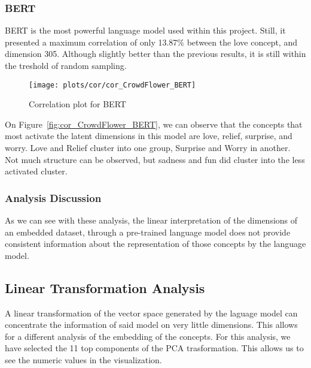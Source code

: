 \subsubsection{BERT}
BERT is the most powerful language model used within this project. Still, it presented a maximum correlation of only 13.87\% between the love concept, and dimension 305. Although slightly better than the previous results, it is still within the treshold of random sampling.
\begin{figure}[H]
  \texttt{[image: plots/cor/cor\_CrowdFlower\_BERT]}
  \centering
  \caption{Correlation plot for BERT}
\end{figure}\label{fig:cor_CrowdFlower_BERT}
On Figure~\ref{fig:cor_CrowdFlower_BERT}, we can observe that the concepts that most activate the latent dimensions in this model are love, relief, surprise, and worry. Love and Relief cluster into one group, Surprise and Worry in another. Not much structure can be observed, but sadness and fun did cluster into the less activated cluster.

\subsubsection{Analysis Discussion}
As we can see with these analysis, the linear interpretation of the dimensions of an embedded dataset, through a pre-trained language model does not provide consistent information about the representation of those concepts by the language model.


\subsection{Linear Transformation Analysis}\label{sub:Linear Transformation Analysis}
A linear transformation of the vector space generated by the laguage model can concentrate the information of said model on very little dimensions. This allows for a different analysis of the embedding of the concepts. For this analysis, we have selected the 11 top components of the PCA trasformation. This allows us to see the numeric values in the visualization.

